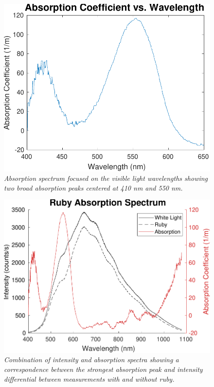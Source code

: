 \documentclass[11pt, a4paper, twocolumn]{article}
\begin{document}
\begin{figure}[]
\includegraphics[width=\linewidth]{absorptionSpectrumFocused.pdf}
\caption{\textit{Absorption spectrum focused on the visible light wavelengths showing two broad absorption peaks centered at 410 nm and 550 nm.}}
\label{fig:intensities}
\end{figure}

\begin{figure}[]
\includegraphics[width=\linewidth]{absorptionAndIntensitySpectra.pdf}
\caption{\textit{Combination of intensity and absorption spectra showing a correspondence between the strongest absorption peak and intensity differential between measurements with and without ruby.}
}
\label{fig:intensities}
\end{figure}
\end{document}
